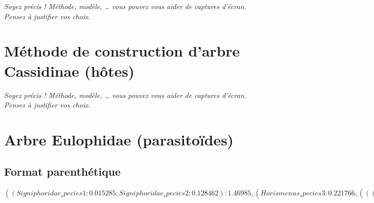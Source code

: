 \documentclass[a4paper, 11pt]{article}
\begin{document}
\textit{Soyez précis ! Méthode, modèle, … vous pouvez vous aider de captures d’écran. Pensez à justifier vos choix.}

\section{Méthode de construction d'arbre Cassidinae (hôtes)}

\emph{Soyez précis ! Méthode, modèle, … vous pouvez vous aider de captures d’écran. Pensez à justifier vos choix.}

\section{Arbre Eulophidae (parasitoïdes)}
\subsection{Format parenthétique} 
$((Signiphoridae_species1:0.015285,Signiphoridae_species2:0.128462):1.46985,(Horismenus_species3:0.221766,(((Horismenus_species5:0.019111,Horismenus_species6:0.05062)72:0.067935,(Horismenus_species1:0.144536,Horismenus_species2:0.156884)96:0.164364)68:0.061764,((Emersonella_tanigaster:0.092657,(((Emersonella_carballoi:0.026058,Emersonella_nr_carballoi:0.014511)99:0.099119,(Emersonella_albicoxa:0.121503,(Emersonella_rotunda_subtype1:0,(Emersonella_rotunda_subtype3:0.025135,Emersonella_rotunda_subtype2:0.0003)53:0.004206)98:0.069929)72:0.015958)49:0.021809,((Emersonella_niveipes_sub1:0.092929,Emersonella_niveipes_sub2:0.054961)96:0.092457,((Emersonella_varicolor:0.218957,((Emersonella_planiceps_subtype1:0.011964,Emersonella_planiceps_subtype2:0)100:0.060833,(Emersonella_species3_subtype1:0.018041,Emersonella_species3_subtype2:0.068031)99:0.101026)69:0.021096)61:0.0243,(Emersonella_rotunda_subtype4:0.146251,Emersonella_rotunda_subtype5:0.097387)16:0.016969)47:0)40:0.00721)67:0.017421)72:1e-06,((((Emersonella_reticulata:0.217408,Emersonella_windsori:0.201281)41:0.0354,(Emersonella_nr_hastata:0.247184,(Emersonella_planiscuta:0.292321,(Emersonella_horismenoides_sub2:0.078355,(Emersonella_horismenoides_sub1:0,Emersonella_species4:0.018414)94:0.047046)94:0.080812)79:0.067887)70:0.030555)60:0.022807,(Emersonella_pubipennis_sub1:0,Emersonella_pubipennis_sub2:0.01323)100:0.16614)59:0.015063,(Emersonella_species2:0.319133,(Emersonella_species1:0.050373,((Emersonella_cuignetae_subtype1:0.006681,Emersonella_cuignetae_subtype2:0.024551)90:0.005161,Aprostocetus_sp:3.67715)62:0.063493)62:0.09989)79:0.066898)59:0.115077)72:0.188936)95:0.086078):0.0773606)73;
$
\end{document}
